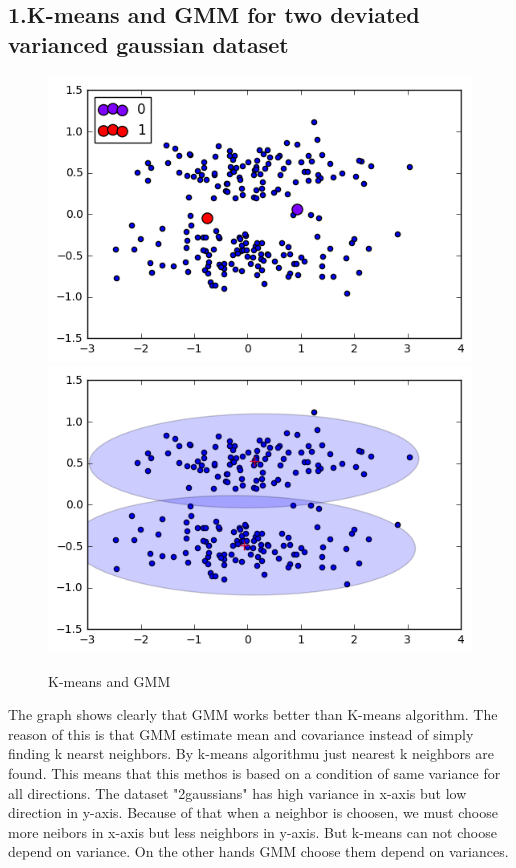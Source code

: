 \documentclass[a4paper,11pt]{article}
\begin{document}
\subsection*{1.K-means and GMM for two deviated varianced gaussian dataset}

\begin{figure}[htbp]
 \includegraphics[scale=0.5]{km2gau.png}
 \includegraphics[scale=0.5]{em2gau.png}
 \caption{K-means and GMM}
\end{figure}
The graph shows clearly that GMM works better than K-means algorithm. The reason of this is that GMM estimate mean and covariance instead of simply finding k nearst neighbors.
By k-means algorithmu just nearest k neighbors are found. This means that this methos is based on a condition of same variance for all directions. The dataset "2gaussians" has high variance in x-axis but low direction in y-axis. Because of that when a neighbor is choosen, we must choose more neibors in x-axis but less neighbors in y-axis. But k-means can not choose depend on variance. On the other hands GMM choose them depend on variances.
\end{document}
